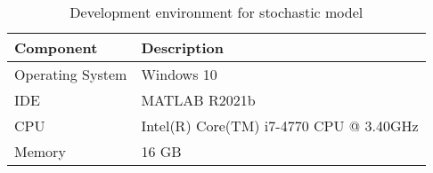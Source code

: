\begin{table}[ht]
    \centering
    \begin{tabular}{ll}
        \toprule
        Component        & Description                             \\\midrule
        Operating System & Windows 10                              \\
        \ac{IDE}              & MATLAB R2021b                           \\
        \ac{CPU}              & Intel(R) Core(TM) i7-4770 CPU @ 3.40GHz \\
        Memory           & 16 GB                                   \\\bottomrule
        \end{tabular}%
    \caption{Development environment for stochastic model}
    \label{tab:env}
\end{table}
